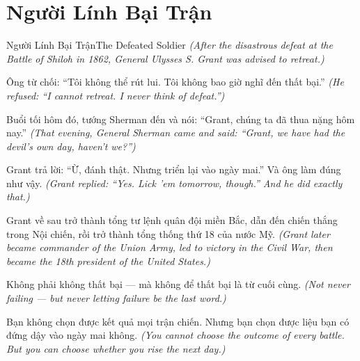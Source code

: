 \section{Người Lính Bại Trận}
\begin{truyen}{Người Lính Bại Trận}{The Defeated Soldier}
\textit{(After the disastrous defeat at the Battle of Shiloh in 1862, General Ulysses S. Grant was advised to retreat.)}

Ông từ chối: ``Tôi không thể rút lui. Tôi không bao giờ nghĩ đến thất bại.''
\textit{(He refused: ``I cannot retreat. I never think of defeat.'')}

Buổi tối hôm đó, tướng Sherman đến và nói: ``Grant, chúng ta đã thua nặng hôm nay.''
\textit{(That evening, General Sherman came and said: ``Grant, we have had the devil's own day, haven't we?'')}

Grant trả lời: ``Ừ, đánh thật. Nhưng triển lại vào ngày mai.'' Và ông làm đúng như vậy.
\textit{(Grant replied: ``Yes. Lick 'em tomorrow, though.'' And he did exactly that.)}

Grant về sau trở thành tổng tư lệnh quân đội miền Bắc, dẫn đến chiến thắng trong Nội chiến, rồi trở thành tổng thống thứ 18 của nước Mỹ.
\textit{(Grant later became commander of the Union Army, led to victory in the Civil War, then became the 18th president of the United States.)}

Không phải không thất bại — mà không để thất bại là từ cuối cùng.
\textit{(Not never failing — but never letting failure be the last word.)}

\end{truyen}

\begin{baihoc}
Bạn không chọn được kết quả mọi trận chiến. Nhưng bạn chọn được liệu bạn có đứng dậy vào ngày mai không.
\textit{(You cannot choose the outcome of every battle. But you can choose whether you rise the next day.)}
\end{baihoc}
\ngancach

